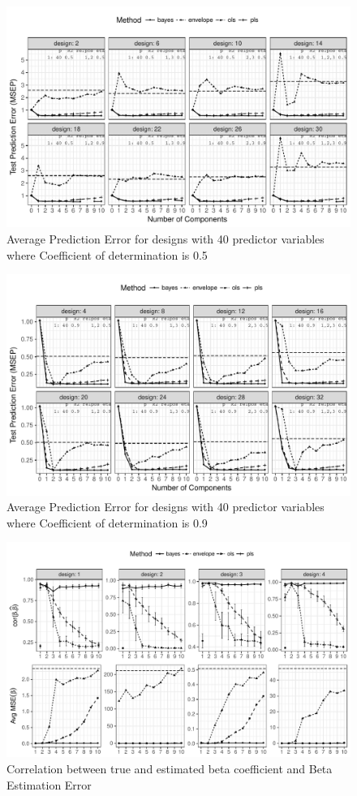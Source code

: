 \documentclass[12pt, a4paper]{article}
\begin{document}
\begin{figure}[!hptb]
  \centering
  \includegraphics[width = \textwidth]{pdf/prediction-error-40-1.pdf}
  \caption[Prediction Error]{Average Prediction Error for designs with 40 predictor
    variables where Coefficient of determination is 0.5}
  \label{fig:pred-error-40-1}
\end{figure}

\pagebreak

\begin{figure}[!hptb]
  \centering
  \includegraphics[width = \textwidth]{pdf/prediction-error-40-2.pdf}
  \caption[Prediction Error]{Average Prediction Error for designs with 40 predictor
    variables where Coefficient of determination is 0.9}
  \label{fig:pred-error-40-2}
\end{figure}

\pagebreak

\begin{figure}[!ht]
  \centering
  \includegraphics[width=\textwidth]{pdf/est-combined-plot.pdf}
  \caption{Correlation between true and estimated beta coefficient and Beta Estimation Error}
  \label{fig:est-error-combined}
\end{figure}
\end{document}
